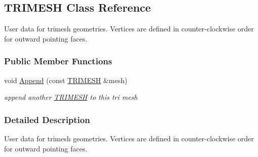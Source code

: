 \hypertarget{classOpenRAVE_1_1KinBody_1_1Link_1_1TRIMESH}{
\subsection{TRIMESH Class Reference}
\label{classOpenRAVE_1_1KinBody_1_1Link_1_1TRIMESH}
}


User data for trimesh geometries. Vertices are defined in counter-\/clockwise order for outward pointing faces.  


\subsubsection*{Public Member Functions}
\begin{DoxyCompactItemize}
\item 
\hypertarget{classOpenRAVE_1_1KinBody_1_1Link_1_1TRIMESH_add133d6bc393a1ade122f72320a6e165}{
void \hyperlink{classOpenRAVE_1_1KinBody_1_1Link_1_1TRIMESH_add133d6bc393a1ade122f72320a6e165}{Append} (const \hyperlink{classOpenRAVE_1_1KinBody_1_1Link_1_1TRIMESH}{TRIMESH} \&mesh)}
\label{classOpenRAVE_1_1KinBody_1_1Link_1_1TRIMESH_add133d6bc393a1ade122f72320a6e165}

\begin{DoxyCompactList}\small\item\em append another \hyperlink{classOpenRAVE_1_1KinBody_1_1Link_1_1TRIMESH}{TRIMESH} to this tri mesh \item\end{DoxyCompactList}\end{DoxyCompactItemize}


\subsubsection{Detailed Description}
User data for trimesh geometries. Vertices are defined in counter-\/clockwise order for outward pointing faces. 